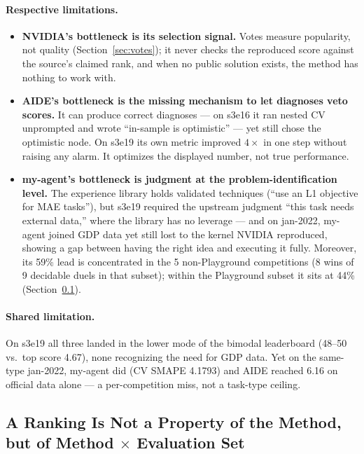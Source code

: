 \documentclass[11pt,a4paper]{article}
\begin{document}
\paragraph{Respective limitations.}
\begin{itemize}[leftmargin=*]
\item \textbf{NVIDIA's bottleneck is its selection signal.} Votes measure popularity, not quality (Section~\ref{sec:votes}); it never checks the reproduced score against the source's claimed rank, and when no public solution exists, the method has nothing to work with.
\item \textbf{AIDE's bottleneck is the missing mechanism to let diagnoses veto scores.} It can produce correct diagnoses --- on s3e16 it ran nested CV unprompted and wrote ``in-sample is optimistic'' --- yet still chose the optimistic node. On s3e19 its own metric improved $4\times$ in one step without raising any alarm. It optimizes the displayed number, not true performance.
\item \textbf{my-agent's bottleneck is judgment at the problem-identification level.} The experience library holds validated techniques (``use an L1 objective for MAE tasks''), but s3e19 required the upstream judgment ``this task needs external data,'' where the library has no leverage --- and on jan-2022, my-agent joined GDP data yet still lost to the kernel NVIDIA reproduced, showing a gap between having the right idea and executing it fully. Moreover, its 59\% lead is concentrated in the 5 non-Playground competitions (8 wins of 9 decidable duels in that subset); within the Playground subset it sits at 44\% (Section~\ref{sec:reversal}).
\end{itemize}

\paragraph{Shared limitation.} On s3e19 all three landed in the lower mode of the bimodal leaderboard (48--50 vs.\ top score 4.67), none recognizing the need for GDP data. Yet on the same-type jan-2022, my-agent did (CV SMAPE 4.1793) and AIDE reached 6.16 on official data alone --- a per-competition miss, not a task-type ceiling.

\subsection{A Ranking Is Not a Property of the Method, but of Method $\times$ Evaluation Set}
\label{sec:reversal}
\end{document}
